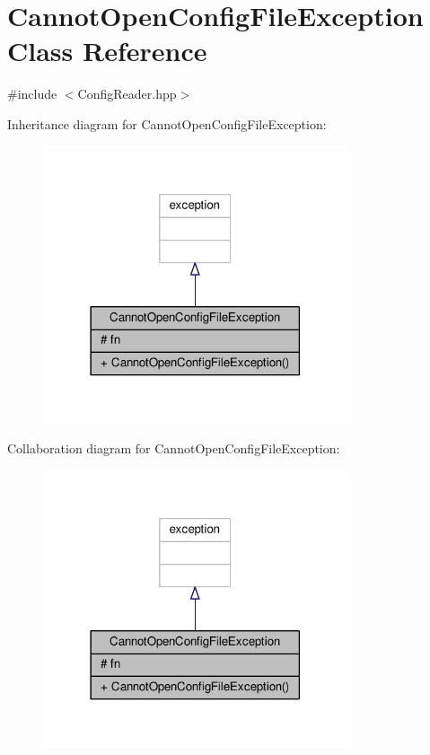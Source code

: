 \hypertarget{class_cannot_open_config_file_exception}{}\section{Cannot\+Open\+Config\+File\+Exception Class Reference}
\label{class_cannot_open_config_file_exception}


{\ttfamily \#include $<$Config\+Reader.\+hpp$>$}



Inheritance diagram for Cannot\+Open\+Config\+File\+Exception\+:\nopagebreak
\begin{figure}[H]
\begin{center}
\leavevmode
\includegraphics[width=254pt]{class_cannot_open_config_file_exception__inherit__graph}
\end{center}
\end{figure}


Collaboration diagram for Cannot\+Open\+Config\+File\+Exception\+:\nopagebreak
\begin{figure}[H]
\begin{center}
\leavevmode
\includegraphics[width=254pt]{class_cannot_open_config_file_exception__coll__graph}
\end{center}
\end{figure}
